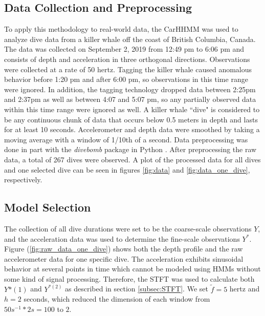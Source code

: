 

\subsection{Data Collection and Preprocessing}

To apply this methodology to real-world data, the CarHHMM was used to analyze dive data from a killer whale off the coast of British Columbia, Canada. The data was collected on September 2, 2019 from 12:49 pm to 6:06 pm and consists of depth and acceleration in three orthogonal directions. Observations were collected at a rate of 50 hertz. Tagging the killer whale caused anomalous behavior before 1:20 pm and after 6:00 pm, so observations in this time range were ignored. In addition, the tagging technology dropped data between 2:25pm and 2:37pm as well as between 4:07 and 5:07 pm, so any partially observed data within this time range were ignored as well. A killer whale ``dive" is considered to be any continuous chunk of data that occurs below 0.5 meters in depth and lasts for at least 10 seconds. Accelerometer and depth data were smoothed by taking a moving average with a window of 1/10th of a second. Data preprocessing was done in part with the \textit{divebomb} package in Python \cite{Nunes:2018}. After preprocessing the raw data, a total of 267 dives were observed. A plot of the processed data for all dives and one selected dive can be seen in figures \ref{fig:data} and \ref{fig:data_one_dive}, respectively.

\subsection{Model Selection}

The collection of all dive durations were set to be the coarse-scale observations $Y$, and the acceleration data was used to determine the fine-scale observations $Y^*$. Figure (\ref{fig:raw_data_one_dive}) shows both the depth profile and the raw accelerometer data for one specific dive. The acceleration exhibits sinusoidal behavior at several points in time which cannot be modeled using HMMs without some kind of signal processing. Therefore, the STFT was used to calculate both $Y{*(1)}$ and $Y^{*(2)}$ as described in section \ref{subsec:STFT}. We set $\tilde{f} = 5$ hertz and $h = 2$ seconds, which reduced the dimension of each window from $50 s^{-1} * 2 s = 100$ to $2$.

